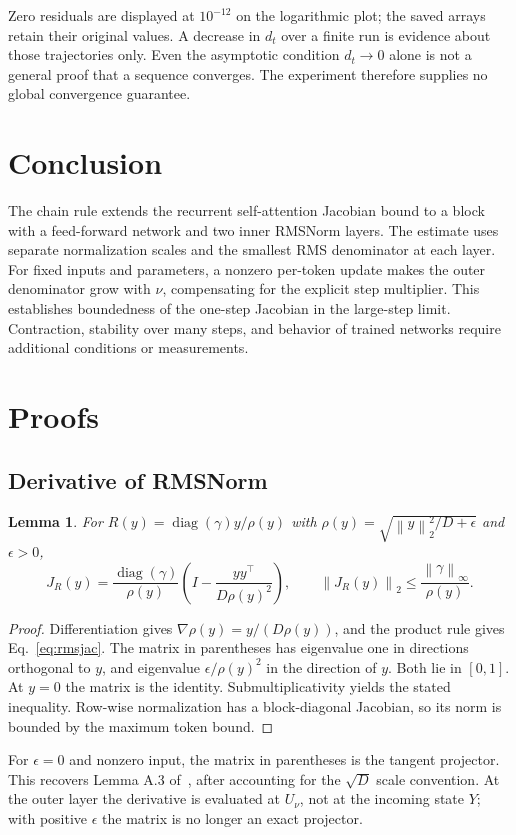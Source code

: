 \documentclass[11pt]{article}
\newtheorem{lemma}{Lemma}[section]
\newcommand{\diag}{\operatorname{diag}}
\newcommand{\norm}[1]{\left\|#1\right\|}
\numberwithin{equation}{section}
\begin{document}
Zero residuals are displayed at $10^{-12}$ on the logarithmic plot; the saved
arrays retain their original values. A decrease in $d_t$ over a finite run is
evidence about those trajectories only.
Even the asymptotic condition $d_t\to0$ alone is not a general proof that a
sequence converges. The experiment therefore supplies no global convergence
guarantee.

\section{Conclusion}
The chain rule extends the recurrent self-attention Jacobian bound to a block
with a feed-forward network and two inner RMSNorm layers. The estimate uses
separate normalization scales and the smallest RMS denominator at each layer.
For fixed inputs and parameters, a nonzero per-token update makes the outer
denominator grow with $\nu$, compensating for the explicit step multiplier.
This establishes boundedness of the one-step Jacobian in the large-step limit.
Contraction, stability over many steps, and behavior of trained networks require
additional conditions or measurements.

\appendix
\section{Proofs}
\subsection{Derivative of RMSNorm}
\begin{lemma}\label{lem:rms}
For $R(y)=\diag(\gamma)y/\rho(y)$ with
$\rho(y)=\sqrt{\norm{y}_2^2/D+\epsilon}$ and $\epsilon>0$,
\begin{equation}\label{eq:rmsjac}
J_R(y)=\frac{\diag(\gamma)}{\rho(y)}
\left(I-\frac{yy^\top}{D\rho(y)^2}\right),\qquad
\norm{J_R(y)}_2\leq\frac{\norm{\gamma}_\infty}{\rho(y)}.
\end{equation}
\end{lemma}
\begin{proof}
Differentiation gives $\nabla\rho(y)=y/(D\rho(y))$, and the product rule
gives Eq.~\eqref{eq:rmsjac}. The matrix in parentheses has eigenvalue one in
directions orthogonal to $y$, and eigenvalue $\epsilon/\rho(y)^2$ in the
direction of $y$. Both lie in $[0,1]$. At $y=0$ the matrix is the identity.
Submultiplicativity yields the stated inequality. Row-wise normalization has
a block-diagonal Jacobian, so its norm is bounded by the maximum token bound.
\end{proof}
For $\epsilon=0$ and nonzero input, the matrix in parentheses is the tangent
projector. This recovers Lemma A.3 of~\cite{tomihari2025recurrent}, after
accounting for the $\sqrt D$ scale convention. At the outer layer the derivative
is evaluated at $U_\nu$, not at the incoming state $Y$; with positive $\epsilon$
the matrix is no longer an exact projector.
\end{document}
